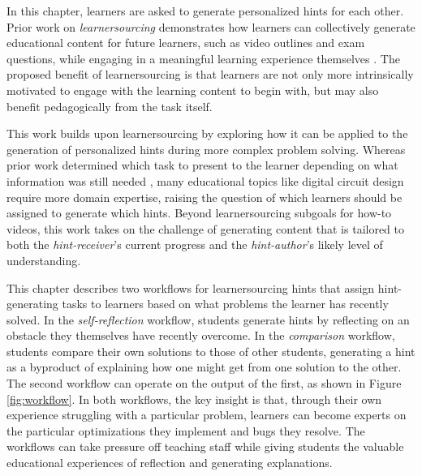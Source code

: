 In this chapter, learners are asked to generate personalized hints for each other. Prior work on \textit{learnersourcing} demonstrates how learners can collectively generate educational content for future learners, such as video outlines and exam questions, while engaging in a meaningful learning experience themselves \cite{kim2013learnersourcing,weir2015,mitros2015}. The proposed benefit of learnersourcing is that learners are not only more intrinsically motivated to engage with the learning content to begin with, but may also benefit pedagogically from the task itself.

This work builds upon learnersourcing by exploring how it can be applied to the generation of personalized hints during more complex problem solving. Whereas prior work determined which task to present to the learner depending on what information was still needed \cite{weir2015}, many educational topics like digital circuit design require more domain expertise, raising the question of which learners should be assigned to generate which hints. Beyond learnersourcing subgoals for how-to videos, this work takes on the challenge of generating content that is tailored to both the \textit{hint-receiver}'s current progress and the \textit{hint-author}'s likely level of understanding. 

This chapter describes two workflows for learnersourcing hints that assign hint-generating tasks to learners based on what problems the learner has recently solved. In the \textit{self-reflection} workflow, students generate hints by reflecting on an obstacle they themselves have recently overcome. In the \textit{comparison} workflow, students compare their own solutions to those of other students, generating a hint as a byproduct of explaining how one might get from one solution to the other. The second workflow can operate on the output of the first, as shown in Figure \ref{fig:workflow}. In both workflows, the key insight is that, through their own experience struggling with a particular problem, learners can become experts on the particular optimizations they implement and bugs they resolve. The workflows can take pressure off teaching staff while giving students the valuable educational experiences of reflection and generating explanations. 

